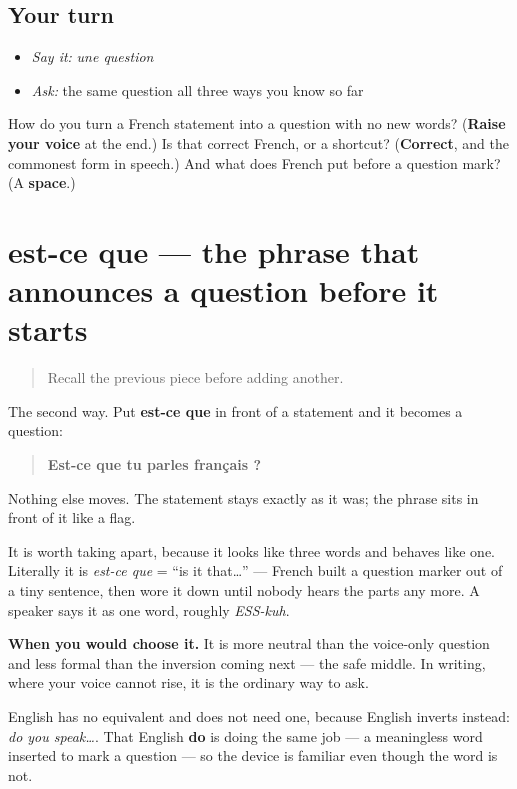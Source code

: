 \subsection*{Your turn}
\begin{itemize}
\raggedright
  \item \emph{Say it:} \emph{une question}
  \item \emph{Ask:} the same question all three ways you know so far
\end{itemize}

\begin{tcolorbox}[breakable,colback=teal!4,colframe=teal!35!black,title={Before you move on}]
How do you turn a French statement into a question with no new words? (\textbf{Raise your voice} at the end.) Is that correct French, or a shortcut? (\textbf{Correct}, and the commonest form in speech.) And what does French put before a question mark? (A \textbf{space}.)
\end{tcolorbox}
\section[est-ce que]{est-ce que — the phrase that announces a question before it starts}

\label{lesson:FR-C32-est-ce-que}



\begin{quote}
Recall the previous piece before adding another.
\end{quote}

\begin{cousinweb}
The second way. Put \textbf{est-ce que} in front of a statement and it becomes a question:

\begin{quote}
\textbf{Est-ce que tu parles français ?}
\end{quote}

Nothing else moves. The statement stays exactly as it was; the phrase sits in front of it like a flag.

It is worth taking apart, because it looks like three words and behaves like one. Literally it is \emph{est-ce que} = \textquotedblleft{}is it that…\textquotedblright{} — French built a question marker out of a tiny sentence, then wore it down until nobody hears the parts any more. A speaker says it as one word, roughly \emph{ESS-kuh}.

\textbf{When you would choose it.} It is more neutral than the voice-only question and less formal than the inversion coming next — the safe middle. In writing, where your voice cannot rise, it is the ordinary way to ask.

English has no equivalent and does not need one, because English inverts instead: \emph{do you speak…}. That English \textbf{do} is doing the same job — a meaningless word inserted to mark a question — so the device is familiar even though the word is not.
\end{cousinweb}

